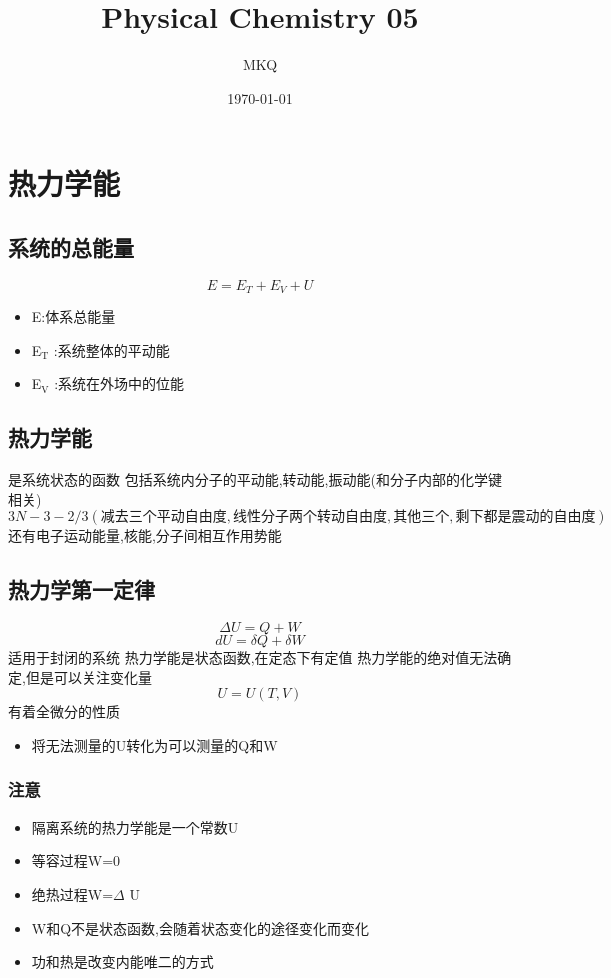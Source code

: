 \documentclass[11pt]{article}
\author{MKQ}
\date{\today}
\title{Physical Chemistry 05}
\begin{document}
\maketitle
\tableofcontents

\section{热力学能}
\label{sec:orgbc1b279}
\subsection{系统的总能量}
\label{sec:org1bcde99}
\[
E=E_T +E_V +U
\]
\begin{itemize}
\item E:体系总能量
\item E\(_{\text{T}}\) :系统整体的平动能
\item E\(_{\text{V}}\) :系统在外场中的位能
\end{itemize}
\subsection{热力学能}
\label{sec:org06c7096}
是系统状态的函数
包括系统内分子的平动能,转动能,振动能(和分子内部的化学键相关)
\[
3N-3-2/3(减去三个平动自由度,线性分子两个转动自由度,其他三个,剩下都是震动的自由度)
\]
还有电子运动能量,核能,分子间相互作用势能
\subsection{热力学第一定律}
\label{sec:orgeb9e0cb}
\[
\Delta U=Q+W
\]
\[
dU=\delta Q+\delta W
\]
适用于封闭的系统
热力学能是状态函数,在定态下有定值
热力学能的绝对值无法确定,但是可以关注变化量
\[
U=U(T,V)
\]
有着全微分的性质
\begin{itemize}
\item 将无法测量的U转化为可以测量的Q和W
\end{itemize}
\subsubsection{注意}
\label{sec:orgf2c5f30}
\begin{itemize}
\item 隔离系统的热力学能是一个常数U
\item 等容过程W=0
\item 绝热过程W=\(\Delta\) U
\item W和Q不是状态函数,会随着状态变化的途径变化而变化
\item 功和热是改变内能唯二的方式
\end{itemize}
\end{document}
